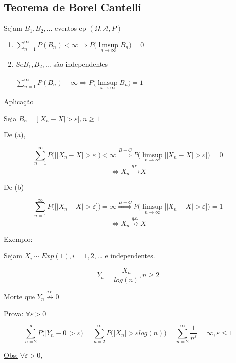 \documentclass[a4paper,12pt]{article}
\begin{document}
\begin{enumerate}[label =\arabic*)]
\subsection{Teorema de Borel Cantelli}

Sejam $B_1,B_2,\ldots$ eventos ep $(\Omega,\mathscr{A},P)$
\begin{enumerate}[label=\alph*)]
	\item $\sum\limits_{n=1}^{\infty} P(B_n) <\infty \Rightarrow P\bigg(
	\limsup\limits_{n\rightarrow \infty} B_n
	\bigg)=0$
	
	\item $Se B_1,B_2,\ldots$ são independentes\\
	\\
	$\sum\limits_{n=1}^{\infty} P(B_n) -\infty \Rightarrow P\bigg(
	\limsup\limits_{n\rightarrow \infty} B_n
	\bigg)=1$
\end{enumerate}

\underline{Aplicação}

Seja $B_n = \bigg[ |X_n-X|>\varepsilon
\bigg], n \ge 1$

De (a),

$$\sum\limits_{n=1}^{\infty}P\bigg( \bigg[ |X_n-X|>\varepsilon
\bigg]\bigg) <\infty  \overset{B-C}{\Rightarrow} P\bigg(	\limsup\limits_{n\rightarrow \infty} \bigg[ |X_n-X|>\varepsilon
\bigg]\bigg)=0
$$ 
$$\Leftrightarrow X_n \overset{q.c.}{\longrightarrow}  X $$

De (b)

$$ \sum\limits_{n=1}^{\infty}P\bigg( \bigg[ |X_n-X|>\varepsilon
\bigg]\bigg) =\infty
 \overset{B-C}{\Rightarrow} P\bigg(	\limsup\limits_{n\rightarrow \infty} \bigg[ |X_n-X|>\varepsilon
\bigg]\bigg)=1
$$
$$\Leftrightarrow X_n \overset{q.c.}{\not\longrightarrow}  X $$
\end{enumerate}

\underline{Exemplo}: 

Sejam $X_i \sim Exp(1), i=1,2,\ldots$ e independentes.

$$Y_n = \frac{X_n}{log(n)}, n\ge 2 $$

Morte que $Y_n \overset{q.c.}{\not\longrightarrow} 0$

\underline{Prova:}
$\forall \varepsilon>0$

$$\sum\limits_{n=2}^{\infty} P\bigg(
|Y_n-0|>\varepsilon
\bigg) = \sum\limits_{n=2}^{\infty} P\bigg(
|X_n| > \varepsilon log(n)
\bigg)  = \sum\limits_{n=2}^{\infty} \frac{1}{n^\varepsilon}= \infty, \varepsilon \le 1 $$

\underline{Obs:}
$\forall \varepsilon >0 $,
\end{document}
